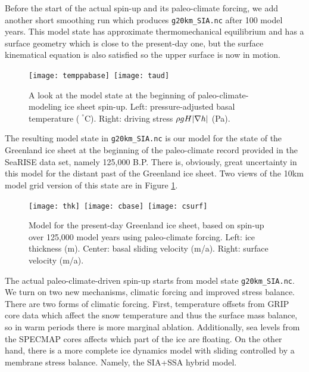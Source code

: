 Before the start of the actual spin-up and its paleo-climate forcing, we add another short smoothing run which produces \texttt{g20km_SIA.nc} after 100 model years.  This model state has approximate thermomechanical equilibrium and has a surface geometry which is close to the present-day one, but the surface kinematical equation is also satisfied so the upper surface is now in motion.

\begin{figure}[ht]
\centering
\mbox{\texttt{[image: temppabase]}
  \qquad \texttt{[image: taud]}}
\caption{A look at the model state at the beginning of paleo-climate-modeling ice sheet spin-up.  Left: pressure-adjusted basal temperature ($\phantom{|}^\circ$C).  Right: driving stress $\rho g H |\nabla h|$ (Pa).}
\label{fig:sr-spinstart}
\end{figure}

The resulting model state in \texttt{g20km_SIA.nc} is our model for the state of the Greenland ice sheet at the beginning of the paleo-climate record provided in the SeaRISE data set, namely 125,000 B.P.  There is, obviously, great uncertainty in this model for the distant past of the Greenland ice sheet.  Two views of the 10km model grid version of this state are in Figure \ref{fig:sr-spinstart}.

\begin{figure}[ht]
\centering
\mbox{\texttt{[image: thk]}
  \qquad \texttt{[image: cbase]}
  \qquad \texttt{[image: csurf]}}
\caption{Model for the present-day Greenland ice sheet, based on spin-up over 125,000 model years using paleo-climate forcing.  Left: ice thickness (m).  Center: basal sliding velocity (m/a).  Right: surface velocity (m/a).}
\label{fig:sr-spindone-map}
\end{figure}


The actual paleo-climate-driven spin-up starts from model state \texttt{g20km_SIA.nc}.  We turn on two new mechanisms, climatic forcing and improved stress balance.  There are two forms of climatic forcing. First, temperature offsets from GRIP core data which affect the snow temperature and thus the surface mass balance, so in warm periods there is more marginal ablation.  Additionally, sea levels from the SPECMAP cores affects which part of the ice are floating.  On the other hand, there is a more complete ice dynamics model with sliding controlled by a membrane stress balance.  Namely, the SIA+SSA hybrid model.

